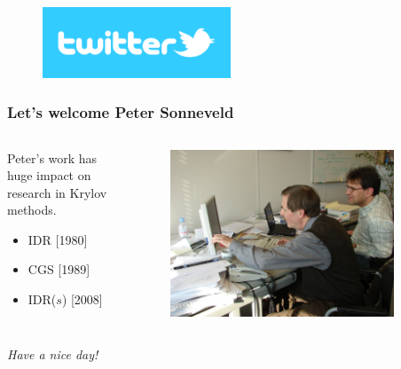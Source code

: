 \documentclass{beamer}
\begin{document}
\begin{frame}
\huge{
  \begin{figure}[t]
  \includegraphics[width=0.5\textwidth]{pics/twitter-logo.png}
  \end{figure}
}
\end{frame}

\begin{frame}
\frametitle{Let's welcome Peter Sonneveld}
 \begin{columns}
 \begin{column}{0.6\textwidth}
 Peter's work has huge impact on research in Krylov methods.
 \begin{itemize}
  \item IDR [1980]
  \item CGS [1989]
  \item IDR($s$) [2008]
 \end{itemize}
 \end{column}

 \begin{column}{0.4\textwidth}
  \begin{figure}[t]
  \includegraphics[width=0.9\textwidth]{pics/idr1.jpg}
  \end{figure}
 \end{column}
 \end{columns}
 \vspace{1cm}
 \pause
 \begin{center}
  \textit{Have a nice day!}
 \end{center}
\end{frame}
\end{document}
